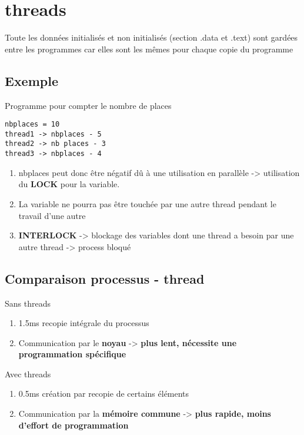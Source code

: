 \section{threads}
Toute les données initialisés et non initialisés (section .data et .text) sont gardées entre les programmes car elles sont les mêmes pour chaque copie du programme

\subsection{Exemple}
Programme pour compter le nombre de places
\begin{lstlisting}
nbplaces = 10
thread1 -> nbplaces - 5
thread2 -> nb places - 3
thread3 -> nbplaces - 4
\end{lstlisting}
\begin{enumerate}
\item nbplaces peut donc être négatif dû à une utilisation en parallèle -> utilisation du \textbf{LOCK} pour la variable.
\item La variable ne pourra pas être touchée par une autre thread pendant le travail d'une autre
\item \textbf{INTERLOCK} -> blockage des variables dont une thread a besoin par une autre thread -> process bloqué
\end{enumerate}

\subsection{Comparaison processus - thread}
Sans threads
\begin{enumerate}
\item 1.5ms recopie intégrale du processus
\item Communication par le \textbf{noyau} -> \textbf{plus lent, nécessite une programmation spécifique}
\end{enumerate}

Avec threads
\begin{enumerate}
\item 0.5ms création par recopie de certains éléments
\item Communication par la \textbf{mémoire commune} -> \textbf{plus rapide, moins d'effort de programmation}
\end{enumerate}
